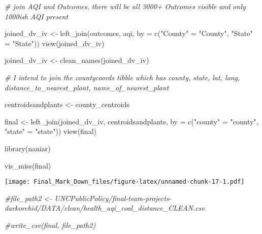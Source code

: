 \documentclass[
]{article}
\newenvironment{Shaded}{\begin{snugshade}}{\end{snugshade}}
\newcommand{\AttributeTok}[1]{\textcolor[rgb]{0.77,0.63,0.00}{#1}}
\newcommand{\CommentTok}[1]{\textcolor[rgb]{0.56,0.35,0.01}{\textit{#1}}}
\newcommand{\FunctionTok}[1]{\textcolor[rgb]{0.00,0.00,0.00}{#1}}
\newcommand{\NormalTok}[1]{#1}
\newcommand{\OtherTok}[1]{\textcolor[rgb]{0.56,0.35,0.01}{#1}}
\newcommand{\StringTok}[1]{\textcolor[rgb]{0.31,0.60,0.02}{#1}}
\begin{document}
\begin{Shaded}
\begin{Highlighting}[]
\CommentTok{\# join AQI and Outcomes, there will be all 3000+ Outcomes visible and only 1000ish AQI present}

\NormalTok{joined\_dv\_iv }\OtherTok{\textless{}{-}} \FunctionTok{left\_join}\NormalTok{(outcomes, aqi, }\AttributeTok{by =} \FunctionTok{c}\NormalTok{(}\StringTok{"County"} \OtherTok{=} \StringTok{"County"}\NormalTok{, }\StringTok{"State"} \OtherTok{=} \StringTok{"State"}\NormalTok{))}
\FunctionTok{view}\NormalTok{(joined\_dv\_iv)}
\end{Highlighting}
\end{Shaded}

\begin{Shaded}
\begin{Highlighting}[]
\NormalTok{joined\_dv\_iv }\OtherTok{\textless{}{-}} \FunctionTok{clean\_names}\NormalTok{(joined\_dv\_iv)}

\CommentTok{\# I intend to join the countycoords tibble which has county, state, lat, long, distance\_to\_nearest\_plant, name\_of\_nearest\_plant }

\NormalTok{centroidsandplants }\OtherTok{\textless{}{-}}\NormalTok{ county\_centroids}
\end{Highlighting}
\end{Shaded}

\begin{Shaded}
\begin{Highlighting}[]
\NormalTok{final }\OtherTok{\textless{}{-}} \FunctionTok{left\_join}\NormalTok{(joined\_dv\_iv, centroidsandplants, }\AttributeTok{by =} \FunctionTok{c}\NormalTok{(}\StringTok{"county"} \OtherTok{=} \StringTok{"county"}\NormalTok{, }\StringTok{"state"} \OtherTok{=} \StringTok{"state"}\NormalTok{))}
\FunctionTok{view}\NormalTok{(final)}
\end{Highlighting}
\end{Shaded}

\begin{Shaded}
\begin{Highlighting}[]
\FunctionTok{library}\NormalTok{(naniar)}

\FunctionTok{vis\_miss}\NormalTok{(final)}
\end{Highlighting}
\end{Shaded}

\texttt{[image: Final\_Mark\_Down\_files/figure-latex/unnamed-chunk-17-1.pdf]}

\begin{Shaded}
\begin{Highlighting}[]
\CommentTok{\#file\_path2 \textless{}{-} UNCPublicPolicy/final{-}team{-}projects{-}darkorchid/DATA/clean/health\_aqi\_coal\_distance\_CLEAN.csv}

\CommentTok{\#write\_csv(final, file\_path2)}
\end{Highlighting}
\end{Shaded}
\end{document}
